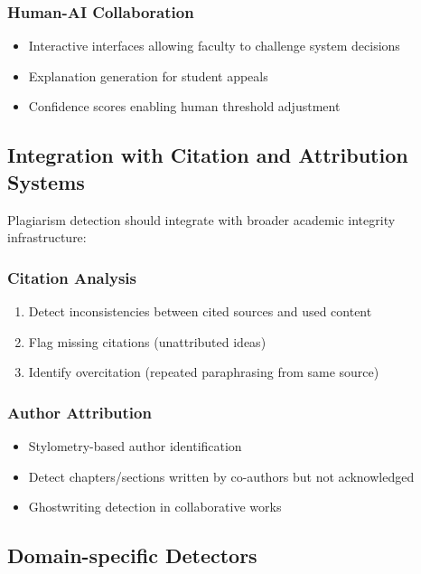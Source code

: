 \subsubsection{Human-AI Collaboration}

\begin{itemize}
  \item Interactive interfaces allowing faculty to challenge system decisions
  \item Explanation generation for student appeals
  \item Confidence scores enabling human threshold adjustment
\end{itemize}

\subsection{Integration with Citation and Attribution Systems}

Plagiarism detection should integrate with broader academic integrity infrastructure:

\subsubsection{Citation Analysis}

\begin{enumerate}
  \item Detect inconsistencies between cited sources and used content
  \item Flag missing citations (unattributed ideas)
  \item Identify overcitation (repeated paraphrasing from same source)
\end{enumerate}

\subsubsection{Author Attribution}

\begin{itemize}
  \item Stylometry-based author identification
  \item Detect chapters/sections written by co-authors but not acknowledged
  \item Ghostwriting detection in collaborative works
\end{itemize}

\subsection{Domain-specific Detectors}

